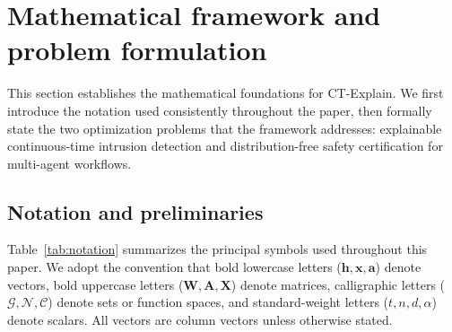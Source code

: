 \documentclass[preprint,review,12pt]{elsarticle}
\newcommand{\vx}{\mathbf{x}}            %
\newcommand{\vh}{\mathbf{h}}            %
\newcommand{\vW}{\mathbf{W}}            %
\newcommand{\vA}{\mathbf{A}}            %
\newcommand{\vX}{\mathbf{X}}            %
\newcommand{\va}{\mathbf{a}}            %
\newcommand{\calG}{\mathcal{G}}
\newcommand{\calN}{\mathcal{N}}
\newcommand{\calC}{\mathcal{C}}
\begin{document}
\section{Mathematical framework and problem formulation}
\label{sec:math_framework}

This section establishes the mathematical foundations for CT-Explain. We first introduce the notation used consistently throughout the paper, then formally state the two optimization problems that the framework addresses: explainable continuous-time intrusion detection and distribution-free safety certification for multi-agent workflows.

\subsection{Notation and preliminaries}
\label{subsec:notation}

Table~\ref{tab:notation} summarizes the principal symbols used throughout this paper. We adopt the convention that bold lowercase letters ($\vh, \vx, \va$) denote vectors, bold uppercase letters ($\vW, \vA, \vX$) denote matrices, calligraphic letters ($\calG, \calN, \calC$) denote sets or function spaces, and standard-weight letters ($t, n, d, \alpha$) denote scalars. All vectors are column vectors unless otherwise stated.
\end{document}
